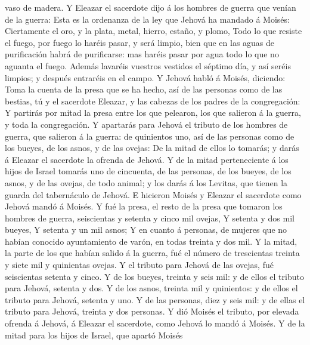 vaso de madera.  Y Eleazar el sacerdote dijo á los hombres
de guerra que venían de la guerra: Esta es la ordenanza de la ley que
Jehová ha mandado á Moisés:  Ciertamente el oro, y la
plata, metal, hierro, estaño, y plomo,  Todo lo que resiste
el fuego, por fuego lo haréis pasar, y será limpio, bien que en las
aguas de purificación habrá de purificarse: mas haréis pasar por agua
todo lo que no aguanta el fuego.  Además lavaréis vuestros
vestidos el séptimo día, y así seréis limpios; y después entraréis en el
campo.  Y Jehová habló á Moisés, diciendo: 
Toma la cuenta de la presa que se ha hecho, así de las personas como de
las bestias, tú y el sacerdote Eleazar, y las cabezas de los padres de
la congregación:  Y partirás por mitad la presa entre los
que pelearon, los que salieron á la guerra, y toda la congregación.
 Y apartarás para Jehová el tributo de los hombres de
guerra, que salieron á la guerra: de quinientos uno, así de las personas
como de los bueyes, de los asnos, y de las ovejas:  De la
mitad de ellos lo tomarás; y darás á Eleazar el sacerdote la ofrenda de
Jehová.  Y de la mitad perteneciente á los hijos de Israel
tomarás uno de cincuenta, de las personas, de los bueyes, de los asnos,
y de las ovejas, de todo animal; y los darás á los Levitas, que tienen
la guarda del tabernáculo de Jehová.  E hicieron Moisés y
Eleazar el sacerdote como Jehová mandó á Moisés.  Y fué la
presa, el resto de la presa que tomaron los hombres de guerra,
seiscientas y setenta y cinco mil ovejas,  Y setenta y dos
mil bueyes,  Y setenta y un mil asnos;  Y en
cuanto á personas, de mujeres que no habían conocido ayuntamiento de
varón, en todas treinta y dos mil.  Y la mitad, la parte de
los que habían salido á la guerra, fué el número de trescientas treinta
y siete mil y quinientas ovejas.  Y el tributo para Jehová
de las ovejas, fué seiscientas setenta y cinco.  Y de los
bueyes, treinta y seis mil: y de ellos el tributo para Jehová, setenta y
dos.  Y de los asnos, treinta mil y quinientos: y de ellos
el tributo para Jehová, setenta y uno.  Y de las personas,
diez y seis mil: y de ellas el tributo para Jehová, treinta y dos
personas.  Y dió Moisés el tributo, por elevada ofrenda á
Jehová, á Eleazar el sacerdote, como Jehová lo mandó á Moisés.
 Y de la mitad para los hijos de Israel, que apartó Moisés
